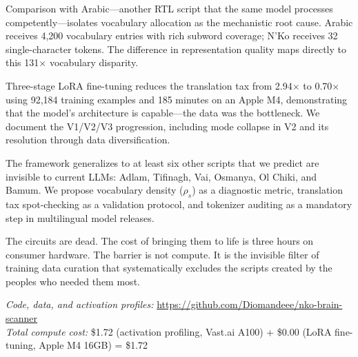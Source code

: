 \documentclass[11pt]{article}
\begin{document}
Comparison with Arabic---another RTL script that the same model processes competently---isolates vocabulary allocation as the mechanistic root cause.
Arabic receives 4,200 vocabulary entries with rich subword coverage; N'Ko receives 32 single-character tokens.
The difference in representation quality maps directly to this 131$\times$ vocabulary disparity.

Three-stage LoRA fine-tuning reduces the translation tax from 2.94$\times$ to 0.70$\times$ using 92,184 training examples and 185 minutes on an Apple M4, demonstrating that the model's architecture is capable---the data was the bottleneck.
We document the V1/V2/V3 progression, including mode collapse in V2 and its resolution through data diversification.

The framework generalizes to at least six other scripts that we predict are invisible to current LLMs: Adlam, Tifinagh, Vai, Osmanya, Ol Chiki, and Bamum.
We propose vocabulary density ($\rho_s$) as a diagnostic metric, translation tax spot-checking as a validation protocol, and tokenizer auditing as a mandatory step in multilingual model releases.

The circuits are dead.
The cost of bringing them to life is three hours on consumer hardware.
The barrier is not compute.
It is the invisible filter of training data curation that systematically excludes the scripts created by the peoples who needed them most.

\vspace{0.5em}
\noindent\textit{Code, data, and activation profiles:} \url{https://github.com/Diomandeee/nko-brain-scanner}\\
\noindent\textit{Total compute cost:} \$1.72 (activation profiling, Vast.ai A100) + \$0.00 (LoRA fine-tuning, Apple M4 16GB) = \$1.72

\end{document}
